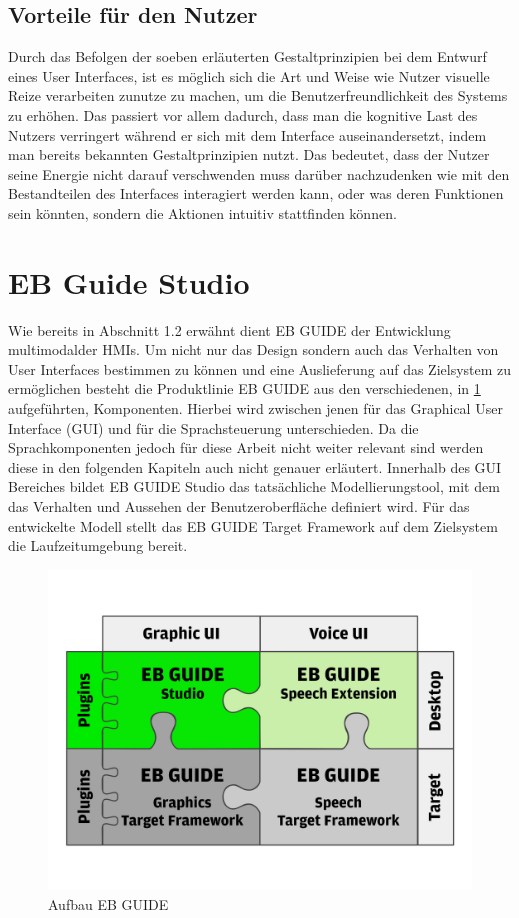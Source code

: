 \subsection*{Vorteile für den Nutzer}
Durch das Befolgen der soeben erläuterten Gestaltprinzipien bei dem Entwurf eines User Interfaces, ist es möglich sich die Art und Weise wie Nutzer visuelle Reize verarbeiten zunutze zu machen, um die Benutzerfreundlichkeit des Systems zu erhöhen.
Das passiert vor allem dadurch, dass man die kognitive Last des Nutzers verringert während er sich mit dem Interface auseinandersetzt, indem man bereits bekannten Gestaltprinzipien nutzt.
Das bedeutet, dass der Nutzer seine Energie nicht darauf verschwenden muss darüber nachzudenken wie mit den Bestandteilen des Interfaces interagiert werden kann, oder was deren Funktionen sein könnten, sondern die Aktionen intuitiv stattfinden können\cite{Knight.2019c}.

\section{EB Guide Studio}
Wie bereits in Abschnitt 1.2 erwähnt dient EB GUIDE der Entwicklung multimodalder HMIs.
Um nicht nur das Design sondern auch das Verhalten von User Interfaces bestimmen zu können und eine Auslieferung auf das Zielsystem zu ermöglichen besteht die Produktlinie EB GUIDE aus den verschiedenen, in \cref{fig:guide_puzzle} aufgeführten, Komponenten.
Hierbei wird zwischen jenen für das Graphical User Interface (GUI) und  für die Sprachsteuerung unterschieden.
Da die Sprachkomponenten jedoch für diese Arbeit nicht weiter relevant sind werden diese in den folgenden Kapiteln auch nicht genauer erläutert.
Innerhalb des GUI Bereiches bildet EB GUIDE Studio das tatsächliche Modellierungstool, mit dem das Verhalten und Aussehen der Benutzeroberfläche definiert wird.
Für das entwickelte Modell stellt das EB GUIDE Target Framework auf dem Zielsystem die Laufzeitumgebung bereit.\cite{.c}

\begin{figure} [H]
\begin{center}
  \includegraphics[scale=0.7]{figures/EB_GUIDE_Puzzle.png}
  \caption{Aufbau EB GUIDE}
  \label{fig:guide_puzzle}
\end{center}
\end{figure}

